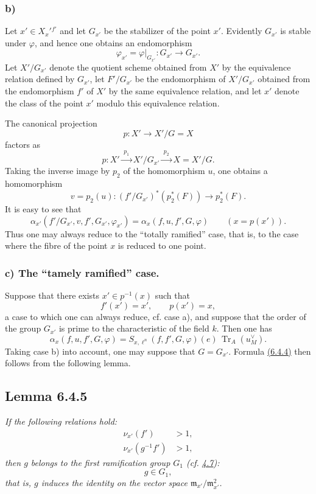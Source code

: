 \documentclass[11pt]{article}
\providecommand{\fm}{\mathfrak{m}}
\providecommand{\Tr}{\operatorname{Tr}}
\providecommand{\Tr}{\operatorname{Tr}}
\providecommand{\Tr}{\operatorname{Tr}}
\providecommand{\Tr}{\operatorname{Tr}}
\providecommand{\fm}{\mathfrak m}
\providecommand{\Tr}{\operatorname{Tr}}
\begin{document}
\subsubsection*{b)} Let $x'\in X_x'{}^{f'}$ and let $G_{x'}$ be the stabilizer of the point $x'$. Evidently $G_{x'}$ is stable under $\varphi$, and hence one obtains an endomorphism
\[
\varphi_{x'}=\varphi|_{G_{x'}}:G_{x'}\longrightarrow G_{x'}.
\]
Let $X'/G_{x'}$ denote the quotient scheme obtained from $X'$ by the equivalence relation defined by $G_{x'}$, let $F'/G_{x'}$ be the endomorphism of $X'/G_{x'}$ obtained from the endomorphism $f'$ of $X'$ by the same equivalence relation, and let $x'$ denote the class of the point $x'$ modulo this equivalence relation.

The canonical projection
\[
p:X'\longrightarrow X'/G=X
\]
factors as
\[
p:X'\xrightarrow{\;p_1\;}X'/G_{x'}\xrightarrow{\;p_2\;}X=X'/G.
\]
Taking the inverse image by $p_2$ of the homomorphism $u$, one obtains a homomorphism
\[
v=p_2(u):(f'/G_{x'})^*(p_2^*(F))\longrightarrow p_2^*(F).
\]
It is easy to see that
\begin{equation}\tag{6.4.3}\label{sga5:XII:equation:6.4.3}
\alpha_{x'}(f'/G_{x'},v,f',G_{x'},\varphi_{x'})
=
\alpha_x(f,u,f',G,\varphi)
\qquad (x=p(x')).
\end{equation}
Thus one may always reduce to the ``totally ramified'' case, that is, to the case where the fibre of the point $x$ is reduced to one point.

\subsubsection*{c) The ``tamely ramified'' case.} Suppose that there exists $x'\in p^{-1}(x)$ such that
\[
f'(x')=x',\qquad p(x')=x,
\]
a case to which one can always reduce, cf. case a), and suppose that the order of the group $G_{x'}$ is prime to the characteristic of the field $k$. Then one has
\begin{equation}\tag{6.4.4}\label{sga5:XII:equation:6.4.4}
\alpha_x(f,u,f',G,\varphi)=S_{x,\ell^n}(f,f',G,\varphi)(e)\,\Tr_A(u_M^\vee).
\end{equation}
Taking case b) into account, one may suppose that $G=G_{x'}$. Formula \hyperref[sga5:XII:equation:6.4.4]{(6.4.4)} then follows from the following lemma.

\subsection*{Lemma 6.4.5}\label{sga5:XII:lemma:6.4.5}
\emph{If the following relations hold:}
\begin{align*}
\nu_{x'}(f')&>1,\\
\nu_{x'}(g^{-1}f')&>1,
\end{align*}
\emph{then $g$ belongs to the first ramification group $G_1$ (cf. \hyperref[sga5:XII:lemma:4.7]{4.7}):}
\[
g\in G_1,
\]
\emph{that is, $g$ induces the identity on the vector space $\fm_{x'}/\fm_{x'}^2$.}
\end{document}
